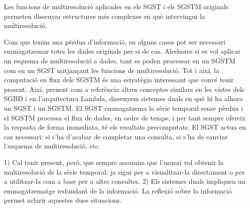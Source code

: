 Les funcions de multiresolució aplicades en els \gls{SGST} i els \gls{SGSTM} originals permeten dissenyar estructures més complexes en què intervingui la multiresolució.


Com que tenim una pèrdua d'informació, en alguns casos pot ser
necessari emmagatzemar totes les dades originals per si de cas.
Aleshores si es vol aplicar un esquema de multiresolució a dades, tant
es poden processar en un \gls{SGSTM} com en un \gls{SGST} mitjançant
les funcions de multiresolució. Tot i així, la computació en flux dels
\gls{SGSTM} és una estratègia interessant que convé tenir
present. Així, prenent com a referència altres conceptes similars en
les vistes dels \gls{SGBD} i en l'arquitectura Lambda, dissenyem
sistemes duals en què hi ha alhora un \gls{SGST} i un \gls{SGSTM}. 
El
\gls{SGST} emmagatzema la sèrie temporal sense pèrdua i el
\gls{SGSTM} processa el flux de dades, en ordre de temps, i per tant sempre ofereix la
resposta de forma immediata, té els resultats precomputats. El \gls{SGST} actua en cas necessari: si
s'ha d'acabar de completar una consulta, si s'ha de canviar l'esquema
de multiresolució, etc.



1) Cal tenir present, però, que sempre assumim que l'usuari vol obtenir la multiresolució de la sèrie temporal: ja sigui per a visualitzar-la directament o per a utilitzar-la com a base per a altre consultes.
2) Els sistemes duals impliquen un emmagatzematge redundant de la informació.
La reflexió sobre la informació permet aclarir aquestes dues situacions.











